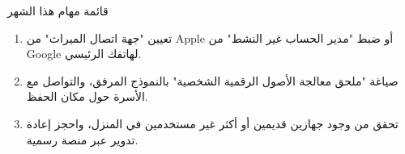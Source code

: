 \begin{tcbpractice}{قائمة مهام هذا الشهر}
\begin{enumerate}
  \item تعيين "جهة اتصال الميراث" من Apple أو ضبط "مدير الحساب غير النشط" من Google لهاتفك الرئيسي.
  \item صياغة "ملحق معالجة الأصول الرقمية الشخصية" بالنموذج المرفق، والتواصل مع الأسرة حول مكان الحفظ.
  \item تحقق من وجود جهازين قديمين أو أكثر غير مستخدمين في المنزل، واحجز إعادة تدوير عبر منصة رسمية.
\end{enumerate}

\end{tcbpractice}
